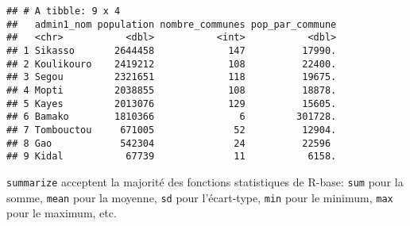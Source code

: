 \documentclass[]{book}
\newenvironment{Shaded}{\begin{snugshade}}{\end{snugshade}}
\newcommand{\KeywordTok}[1]{\textcolor[rgb]{0.13,0.29,0.53}{\textbf{#1}}}
\newcommand{\DataTypeTok}[1]{\textcolor[rgb]{0.13,0.29,0.53}{#1}}
\newcommand{\DecValTok}[1]{\textcolor[rgb]{0.00,0.00,0.81}{#1}}
\newcommand{\StringTok}[1]{\textcolor[rgb]{0.31,0.60,0.02}{#1}}
\newcommand{\CommentTok}[1]{\textcolor[rgb]{0.56,0.35,0.01}{\textit{#1}}}
\newcommand{\OperatorTok}[1]{\textcolor[rgb]{0.81,0.36,0.00}{\textbf{#1}}}
\newcommand{\NormalTok}[1]{#1}
\begin{document}
\begin{Shaded}
\end{Shaded}

\begin{verbatim}
## # A tibble: 9 x 4
##   admin1_nom population nombre_communes pop_par_commune
##   <chr>           <dbl>           <int>           <dbl>
## 1 Sikasso       2644458             147          17990.
## 2 Koulikouro    2419212             108          22400.
## 3 Segou         2321651             118          19675.
## 4 Mopti         2038855             108          18878.
## 5 Kayes         2013076             129          15605.
## 6 Bamako        1810366               6         301728.
## 7 Tombouctou     671005              52          12904.
## 8 Gao            542304              24          22596 
## 9 Kidal           67739              11           6158.
\end{verbatim}

\texttt{summarize} acceptent la majorité des fonctions statistiques de
R-base: \texttt{sum} pour la somme, \texttt{mean} pour la moyenne,
\texttt{sd} pour l'écart-type, \texttt{min} pour le minimum,
\texttt{max} pour le maximum, etc.
\end{document}
